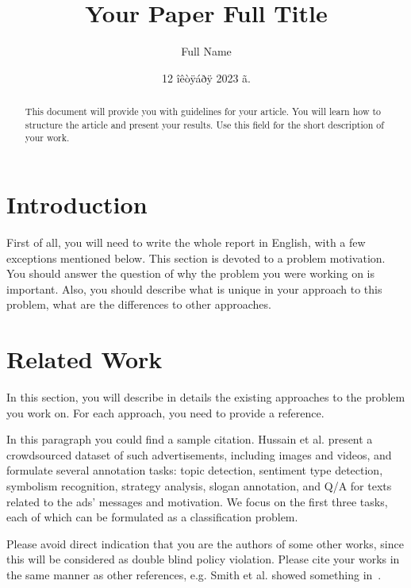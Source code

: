 \documentclass{zapiski}
\date{12 îêòÿáðÿ 2023 ã.}
\begin{document}
\title[Your Paper Short Title]{Your Paper Full Title}


\author[Author]{Full Name}
\address[F.~Name]{Address}

\begin{abstract}
This document will provide you with guidelines for your article. You will learn how to structure the article and present your results. Use this field for the short description of your work.
\end{abstract}


\maketitle

\section{Introduction}
\label{sec:intro}

First of all, you will need to write the whole report in English, with a few exceptions mentioned below.
This section is devoted to a problem motivation. You should answer the question of why the problem you were working on is important. Also, you should describe what is unique in your approach to this problem, what are the differences to other approaches.

\section{Related Work}
\label{sec:related}
In this section, you will describe in details the existing approaches to the problem you work on. For each approach, you need to provide a reference. 

In this paragraph you could find a sample citation.
Hussain et al. \cite{hussain2017automatic} present a crowdsourced dataset of such advertisements, including images and videos, and formulate several annotation tasks: topic detection, sentiment type detection, symbolism recognition, strategy analysis, slogan annotation, and Q/A for texts related to the ads' messages and motivation. We focus on the first three tasks, each of which can be formulated as a classification problem.

Please avoid direct indication that you are the authors of some other works, since this will be considered as double blind policy violation. Please cite your works in the same manner as other references, e.g. Smith et al. showed something in~\cite{smith2007overview}. 
\end{document}
